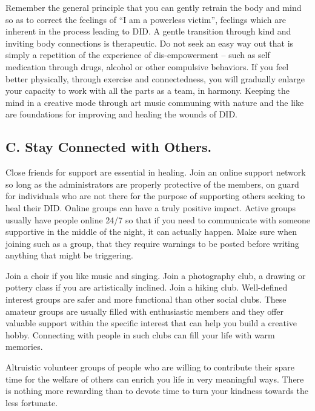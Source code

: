 \documentclass[]{book}
\begin{document}
Remember the general principle that you can gently retrain the body and mind so as to correct the feelings of ``I am a powerless victim'', feelings which are inherent in the process leading to DID. A gentle transition through kind and inviting body connections is therapeutic. Do not seek an easy way out that is simply a repetition of the experience of dis-empowerment -- such as self medication through drugs, alcohol or other compulsive behaviors. If you feel better physically, through exercise and connectedness, you will gradually enlarge your capacity to work with all the parts as a team, in harmony. Keeping the mind in a creative mode through art music communing with nature and the like are foundations for improving and healing the wounds of DID.

\hypertarget{c.-stay-connected-with-others.}{%
\subsection*{C. Stay Connected with Others.}\label{c.-stay-connected-with-others.}}

Close friends for support are essential in healing. Join an online support network so long as the administrators are properly protective of the members, on guard for individuals who are not there for the purpose of supporting others seeking to heal their DID. Online groups can have a truly positive impact. Active groups usually have people online 24/7 so that if you need to communicate with someone supportive in the middle of the night, it can actually happen. Make sure when joining such as a group, that they require warnings to be posted before writing anything that might be triggering.

Join a choir if you like music and singing. Join a photography club, a drawing or pottery class if you are artistically inclined. Join a hiking club. Well-defined interest groups are safer and more functional than other social clubs. These amateur groups are usually filled with enthusiastic members and they offer valuable support within the specific interest that can help you build a creative hobby. Connecting with people in such clubs can fill your life with warm memories.

Altruistic volunteer groups of people who are willing to contribute their spare time for the welfare of others can enrich you life in very meaningful ways. There is nothing more rewarding than to devote time to turn your kindness towards the less fortunate.
\end{document}
